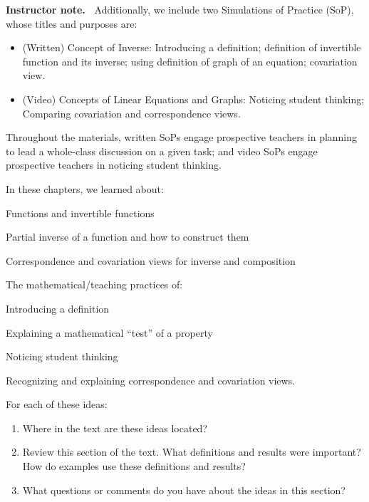 \documentclass[11pt]{article}
\newenvironment{bignote}[1][Instructor note]%
	{\begin{mdframed}\raggedright{\bf #1.~}}
	{\end{mdframed}}
\theoremstyle{definition}
\begin{document}
\begin{bignote}
Additionally, we include two Simulations of Practice (SoP), whose titles and purposes are:
	\begin{itemize}
	\item (Written) Concept of Inverse: Introducing a definition; definition of invertible function and its inverse; using definition of graph of an equation; covariation view.
	\item (Video) Concepts of Linear Equations and Graphs: Noticing student thinking; Comparing covariation and correspondence views.
	\end{itemize}
	
Throughout the \MODULES materials, written SoPs engage prospective teachers in planning to lead a whole-class discussion on a given task; and video SoPs engage prospective teachers in noticing student thinking.
\end{bignote}


\begin{enumerate}
\setcounter{enumi}{-1}
\item In these chapters, we learned about:
	\end{itemize*}
	For each of these ideas: 
	\begin{enumerate}
	\item Where in the text are these ideas located?
	\item Review this section of the text. What definitions and results were important? How do examples use these definitions and results?
	\item What questions or comments do you have about the ideas in this section?
	\end{enumerate}
\end{enumerate}
\end{document}
